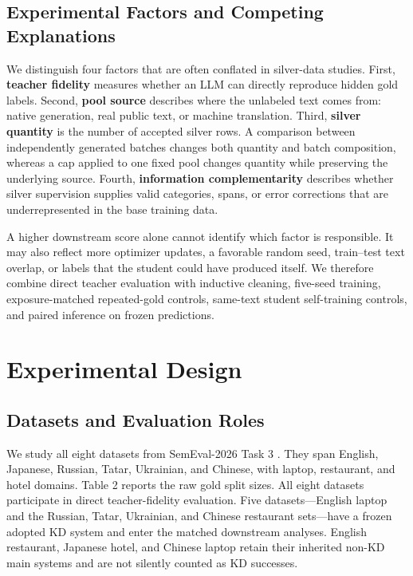 \subsection{Experimental Factors and Competing
Explanations}\label{experimental-factors-and-competing-explanations}

We distinguish four factors that are often conflated in silver-data
studies. First, \textbf{teacher fidelity} measures whether an LLM can
directly reproduce hidden gold labels. Second, \textbf{pool source}
describes where the unlabeled text comes from: native generation, real
public text, or machine translation. Third, \textbf{silver quantity} is
the number of accepted silver rows. A comparison between independently
generated batches changes both quantity and batch composition, whereas a
cap applied to one fixed pool changes quantity while preserving the
underlying source. Fourth, \textbf{information complementarity}
describes whether silver supervision supplies valid categories, spans,
or error corrections that are underrepresented in the base training
data.

A higher downstream score alone cannot identify which factor is
responsible. It may also reflect more optimizer updates, a favorable
random seed, train--test text overlap, or labels that the student could
have produced itself. We therefore combine direct teacher evaluation
with inductive cleaning, five-seed training, exposure-matched
repeated-gold controls, same-text student self-training controls, and
paired inference on frozen predictions.

\section{Experimental Design}\label{experimental-design}

\subsection{Datasets and Evaluation
Roles}\label{datasets-and-evaluation-roles}

We study all eight datasets from SemEval-2026 Task 3
\citep{yu2026semeval}. They span English, Japanese, Russian, Tatar,
Ukrainian, and Chinese, with laptop, restaurant, and hotel domains.
Table 2 reports the raw gold split sizes. All eight datasets participate
in direct teacher-fidelity evaluation. Five datasets---English laptop
and the Russian, Tatar, Ukrainian, and Chinese restaurant sets---have a
frozen adopted KD system and enter the matched downstream analyses.
English restaurant, Japanese hotel, and Chinese laptop retain their
inherited non-KD main systems and are not silently counted as KD
successes.

